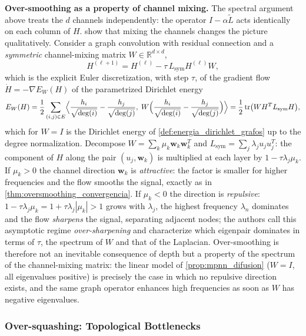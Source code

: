 \textbf{Over-smoothing as a property of channel mixing.} The spectral argument above treats the $d$ channels independently: the operator $I - \alpha\tilde{L}$ acts identically on each column of $H$. \citet{digiovanni2023energies} show that mixing the channels changes the picture qualitatively. Consider a graph convolution with residual connection and a \textit{symmetric} channel-mixing matrix $W \in \mathbb{R}^{d \times d}$,
\begin{equation}\label{eq:flujo_gradiente_conv}
	H^{(\ell+1)} = H^{(\ell)} - \tau\, L_{\mathrm{sym}} H^{(\ell)} W,
\end{equation}
which is the explicit Euler discretization, with step $\tau$, of the gradient flow $\dot{H} = -\nabla E_W(H)$ of the parametrized Dirichlet energy
\[
	E_W(H) = \frac{1}{2}\sum_{(i,j) \in E}\Bigl\langle \frac{h_i}{\sqrt{\deg(i)}} - \frac{h_j}{\sqrt{\deg(j)}},\; W\Bigl(\frac{h_i}{\sqrt{\deg(i)}} - \frac{h_j}{\sqrt{\deg(j)}}\Bigr)\Bigr\rangle = \frac{1}{2}\operatorname{tr}\bigl(W H^T L_{\mathrm{sym}} H\bigr),
\]
which for $W = I$ is the Dirichlet energy of \autoref{def:energia_dirichlet_grafos} up to the degree normalization. Decompose $W = \sum_{k} \mu_k \mathbf{w}_k \mathbf{w}_k^T$ and $L_{\mathrm{sym}} = \sum_{j} \lambda_j u_j u_j^T$: the component of $H$ along the pair $(u_j, \mathbf{w}_k)$ is multiplied at each layer by $1 - \tau\lambda_j\mu_k$. If $\mu_k > 0$ the channel direction $\mathbf{w}_k$ is \textit{attractive}: the factor is smaller for higher frequencies and the flow smooths the signal, exactly as in \autoref{thm:oversmoothing_convergencia}. If $\mu_k < 0$ the direction is \textit{repulsive}: $1 - \tau\lambda_j\mu_k = 1 + \tau\lambda_j|\mu_k| > 1$ grows with $\lambda_j$, the highest frequency $\lambda_n$ dominates and the flow \textit{sharpens} the signal, separating adjacent nodes; the authors call this asymptotic regime \textit{over-sharpening} and characterize which eigenpair dominates in terms of $\tau$, the spectrum of $W$ and that of the Laplacian. Over-smoothing is therefore not an inevitable consequence of depth but a property of the spectrum of the channel-mixing matrix: the linear model of \autoref{prop:mpnn_difusion} ($W = I$, all eigenvalues positive) is precisely the case in which no repulsive direction exists, and the same graph operator enhances high frequencies as soon as $W$ has negative eigenvalues.

\subsubsection{Over-squashing: Topological Bottlenecks}\label{subsubsec:oversquashing}

